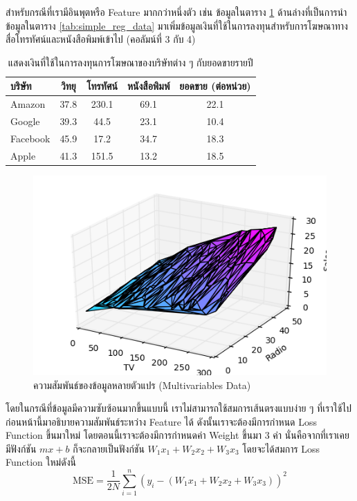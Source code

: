 สำหรับกรณีที่เรามีอินพุตหรือ Feature มากกว่าหนึ่งตัว เช่น ข้อมูลในตาราง \ref{tab:multi_reg_data} ด้านล่างที่เป็นการนำข้อมูลในตาราง \ref{tab:simple_reg_data} มาเพิ่มข้อมูลเงินที่ใช้ในการลงทุนสำหรับการโฆษณาทางสื่อโทรทัศน์และหนังสือพิมพ์เข้าไป (คอลัมน์ที่ 3 กับ 4)

\begin{table}[H]
    \centering
    \caption{แสดงเงินที่ใช้ในการลงทุนการโฆษณาของบริษัทต่าง ๆ กับยอดขายรายปี}
    \label{tab:multi_reg_data}
    \begin{tabular}{lcccc}\toprule
        \textbf{บริษัท} & \textbf{วิทยุ} & \textbf{โทรทัศน์} & \textbf{หนังสือพิมพ์} & \textbf{ยอดขาย (ต่อหน่วย)} \\\midrule
        Amazon        & 37.8         & 230.1           & 69.1              & 22.1                     \\
        Google        & 39.3         & 44.5            & 23.1              & 10.4                     \\
        Facebook      & 45.9         & 17.2            & 34.7              & 18.3                     \\
        Apple         & 41.3         & 151.5           & 13.2              & 18.5                     \\
        \bottomrule
    \end{tabular}
\end{table}

\begin{figure}[H]
    \centering
    \includegraphics[width=0.6\linewidth]{fig/plot_multivar_reg.png}
    \caption{ความสัมพันธ์ของข้อมูลหลายตัวแปร (Multivariables Data)}
    \label{fig:multi_var_reg}
\end{figure}

โดยในกรณีที่ข้อมูลมีความซับซ้อนมากขึ้นแบบนี้ เราไม่สามารถใช้สมการเส้นตรงแบบง่าย ๆ ที่เราใช้ไปก่อนหน้านี้มาอธิบายความสัมพันธ์ระหว่าง Feature ได้ ดังนั้นเราจะต้องมีการกำหนด Loss Function ขึ้นมาใหม่ โดยตอนนี้เราจะต้องมีการกำหนดค่า Weight ขึ้นมา 3 ค่า นั่นคือจากที่เราเคยมีฟังก์ชัน $mx + b$ ก็จะกลายเป็นฟังก์ชัน $W_1 x_1 + W_2 x_2 + W_3 x_3$ โดยจะได้สมการ Loss Function ใหม่ดังนี้
%
\begin{equation}
    \text{MSE} = \frac{1}{2N} \sum_{i=1}^{n} (y_i - (W_1 x_1 + W_2 x_2 + W_3 x_3))^2
\end{equation}


